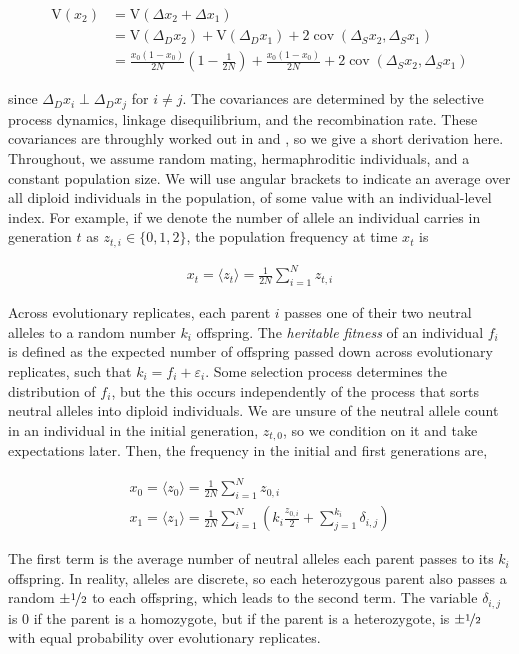 \documentclass[11pt]{article}
\newcommand{\V}{\text{V}}
\DeclareMathOperator{\cov}{cov}
\begin{document}
\begin{align}
  \V(x_2) &= \V\left(\Delta x_2 + \Delta x_1\right) \\
          &= \V(\Delta_D x_2) + \V(\Delta_D x_1) + 2 \cov(\Delta_S x_2, \Delta_S x_1) \\
          &= \frac{x_0(1-x_0)}{2N}\left(1 - \frac{1}{2N}\right) + \frac{x_0(1-x_0)}{2N} +  2 \cov(\Delta_S x_2, \Delta_S x_1) 
\end{align}

since $\Delta_D x_i \perp \Delta_D x_j$ for $i \ne j$. The covariances are
determined by the selective process dynamics, linkage disequilibrium, and the
recombination rate. These covariances are throughly worked out in
\textcite{Santiago1995-hx} and \textcite{Buffalo2019-qs}, so we give a short
derivation here. Throughout, we assume random mating, hermaphroditic
individuals, and a constant population size. We will use angular brackets to
indicate an average over all diploid individuals in the population, of some
value with an individual-level index. For example, if we denote the number of
allele an individual carries in generation $t$ as $z_{t,i} \in \{0, 1, 2\}$,
the population frequency at time $x_t$ is

\begin{align}
  x_t = \langle z_t \rangle = \frac{1}{2N} \sum_{i=1}^N z_{t,i}
\end{align}

Across evolutionary replicates, each parent $i$ passes one of their two neutral
alleles to a random number $k_i$ offspring. The \emph{heritable fitness} of an
individual $f_i$ is defined as the expected number of offspring passed down
across evolutionary replicates, such that $k_i = f_i + \varepsilon_i$.  Some
selection process determines the distribution of $f_i$, but the this occurs
independently of the process that sorts neutral alleles into diploid
individuals. We are unsure of the neutral allele count in an individual in the
initial generation, $z_{t,0}$, so we condition on it and take expectations
later. Then, the frequency in the initial and first generations are,

\begin{align}
  x_0 = \langle z_0 \rangle = \frac{1}{2N} \sum_{i=1}^N z_{0,i} \\
  x_1 = \langle z_1 \rangle = \frac{1}{2N} \sum_{i=1}^N \left( k_i \frac{z_{0,i}}{2} + \sum_{j=1}^{k_i} \delta_{i,j} \right)
\end{align}

The first term is the average number of neutral alleles each parent passes to
its $k_i$ offspring. In reality, alleles are discrete, so each heterozygous
parent also passes a random $\pm \nicefrac{1}{2}$ to each offspring, which
leads to the second term. The variable $\delta_{i,j}$ is 0 if the parent is a
homozygote, but if the parent is a heterozygote, is $\pm \nicefrac{1}{2}$ with
equal probability over evolutionary replicates.
\end{document}
